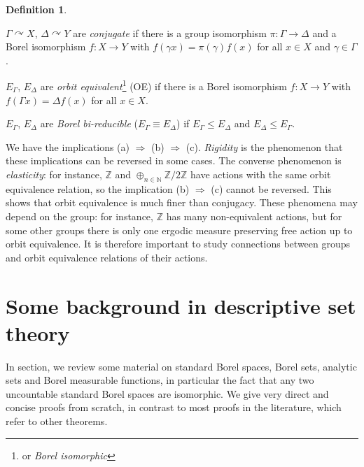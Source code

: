 \documentclass[10pt]{amsart}
\newcommand{\ZZ}{\mathbb{Z}}
\newcommand{\NN}{\mathbb{N}}
\theoremstyle{definition}
\newtheorem*{definition*}{Definition}
\theoremstyle{remark}
\newenvironment{enumerate-(a)}{\begin{enumerate}[label={\upshape (\alph*)}, leftmargin=2pc]}{\end{enumerate}}
\begin{document}
\begin{definition*} 
\begin{enumerate-(a)} 
\item 
$\Gamma\curvearrowright X$, $\Delta\curvearrowright Y$ are \emph{conjugate} if there is a group isomorphism $\pi\colon \Gamma\rightarrow \Delta$ and a Borel isomorphism $f\colon X\rightarrow Y$ with $f(\gamma x)= \pi(\gamma) f(x)$ for all $x\in X$ and $\gamma\in \Gamma$. 
\item 
$E_\Gamma$, $E_\Delta$ are \emph{orbit equivalent}\footnote{or \emph{Borel isomorphic}} (OE) if there is a Borel isomorphism $f\colon X\rightarrow Y$ with $f(\Gamma x)=\Delta f(x)$ for all $x\in X$. 
\item 
$E_\Gamma$, $E_\Delta$ are \emph{Borel bi-reducible} ($E_\Gamma\equiv E_\Delta$) if $E_\Gamma\leq E_\Delta$ and $E_\Delta\leq E_\Gamma$. 
\end{enumerate-(a)} 
\end{definition*} 

We have the implications (a) $\Rightarrow$ (b) $\Rightarrow$ (c). 
\emph{Rigidity} is the phenomenon that these implications can be reversed in some cases. 
The converse phenomenon is \emph{elasticity}: for instance, $\ZZ$ and $\oplus_{n\in\NN} \ZZ/2\ZZ$ have actions with the same orbit equivalence relation, so the implication (b) $\Rightarrow$ (c) cannot be reversed. 
This shows that orbit equivalence is much finer than conjugacy. 
These phenomena may depend on the group: for instance, $\ZZ$ has many non-equivalent actions, but for some other groups there is only one ergodic measure preserving free action up to orbit equivalence. 
It is therefore important to study connections between groups and orbit equivalence relations of their actions. 






\section{Some background in descriptive set theory} 

In section, we review some material on standard Borel spaces, Borel sets, analytic sets and Borel measurable functions, in particular the fact that any two uncountable standard Borel spaces are isomorphic. 
We give very direct and concise proofs from scratch, in contrast to most proofs in the literature, which refer to other theorems. 
\end{document}
